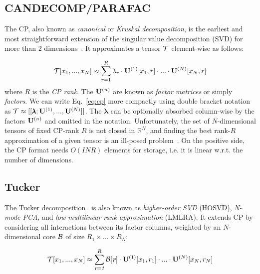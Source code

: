 \documentclass[review, twocolumn]{svjour3}          %
\begin{document}
\subsection{CANDECOMP/PARAFAC}

The CP, also known as \emph{canonical} or \emph{Kruskal decomposition}, is the earliest and most straightforward extension of the singular value decomposition (SVD) for more than 2 dimensions~\cite{Harshman:70}. It approximates a tensor $\mathcal{T}$ element-wise as follows:

\begin{equation}
\label{eq:cp}
\mathcal{T}[x_1, ..., x_N] \approx \sum_{r=1}^R \lambda_r \cdot \mathbf{U}^{(1)}[x_1, r] \cdot ... \cdot \mathbf{U}^{(N)}[x_N, r]
\end{equation}
%
where $R$ is the \emph{CP rank}. The $\mathbf{U}^{(n)}$ are known as \emph{factor matrices} or simply \emph{factors}. We can write Eq.~\ref{eq:cp} more compactly using double bracket notation as $\mathcal{T} \approx [[\pmb{\lambda}; \mathbf{U}^{(1)}, ..., \mathbf{U}^{(N)}]]$. The $\pmb{\lambda}$ can be optionally absorbed column-wise by the factors $\mathbf{U}^{(n)}$ and omitted in the notation. Unfortunately, the set of $N$-dimensional tensors of fixed CP-rank $R$ is not closed in $\mathbb{R}^N$, and finding the best rank-$R$ approximation of a given tensor is an ill-posed problem~\cite{SL:08}. On the positive side, the CP format needs $O(I N R)$ elements for storage, i.e. it is linear w.r.t. the number of dimensions.

\subsection{Tucker}

The Tucker decomposition~\cite{Tucker:66, LMV:00b} is also known as \emph{higher-order SVD} (HOSVD), \emph{N-mode PCA}, and \emph{low multilinear rank approximation} (LMLRA). It extends CP by considering all interactions between its factor columns, weighted by an $N$-dimensional core $\mathcal{B}$ of size $R_1 \times ... \times R_N$:

\begin{equation}
\set{T}[x_1, ..., x_N] \approx \sum_{\vec{r}=\vec{1}}^{\vec{R}} \set{B}[\vec{r}] \cdot \mat{U}^{(1)}[x_1, r_1] \cdot ... \cdot \mat{U}^{(N)}[x_N, r_N]
\end{equation}
\end{document}
